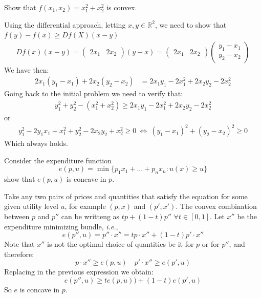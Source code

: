 \documentclass[a4paper,answers]{exam}
\begin{document}
{\begin{questions}
\question Show that $f(x_1,x_2) = x_1^{2}+x_2^{2}$ is convex.

\begin{solution}
	Using the differential approach, letting $x,y\in \mathds{R}^2$, we need to show that $f(y)-f(x) \geq Df(X)(x-y)$
	\begin{align*}
		Df(x)(x-y)=\begin{pmatrix}2x_1 & 2x_2 \end{pmatrix} (y-x) = \begin{pmatrix}2x_1 & 2x_2 \end{pmatrix} \begin{pmatrix}y_1-x_1\\y_2-x_2\end{pmatrix}
	\end{align*}
We have then:
\begin{align*}
	2x_1(y_1-x_1)+2x_2(y_2-x_2) &= 2x_1y_1 - 2x_1^2 + 2x_2y_2-2x_2^2 
\end{align*}
Going back to the initial problem we need to verify that:
\begin{align*}
	y_1^2+y_2^2-(x_1^2+x_2^2)\geq 2x_1y_1 - 2x_1^2 + 2x_2y_2-2x_2^2 
\end{align*}
or 
\begin{align*}
	y_1^2-2y_1x_1+x_1^2+y_2^2- 2x_2y_2 +x_2^2\geq 0 \ \Leftrightarrow\ (y_1-x_1)^2 + (y_2-x_2)^2 \geq 0
\end{align*}
Which always holds.
\end{solution}

\question Consider the expenditure function \[e(p,u)=\min\{p_1x_1+\hdots+p_n x_n: u(x)\geq u\}\] show that $e(p,u)$ is concave in \(p\).

\begin{solution}

Take any two pairs of prices and quantities that satisfy the equation for some given utility level $u$, for example $(p,x)$ and $(p',x')$. The convex combination between $p$ and $p''$ can be writteng as $tp+(1-t)p''$ $\forall t\in[0,1]$. Let $x''$ be the expenditure minimizing bundle, \textit{i.e.},
\[e(p'',u)=p''\cdot x'' = tp\cdot x'' + (1-t)p'\cdot x'' \]
Note that $x''$ is not the optimal choice of quantities be it for $p$ or for $p''$, and therefore:
\[p\cdot x'' \geq e(p,u)\quad p'\cdot x''\geq e(p',u)\]
Replacing in the previous expression we obtain:
\[e(p'',u)\geq te(p,u))+(1-t)e(p',u)\]
So $e$ is concave in $p$.
\end{solution}



\end{questions}}
\end{document}
